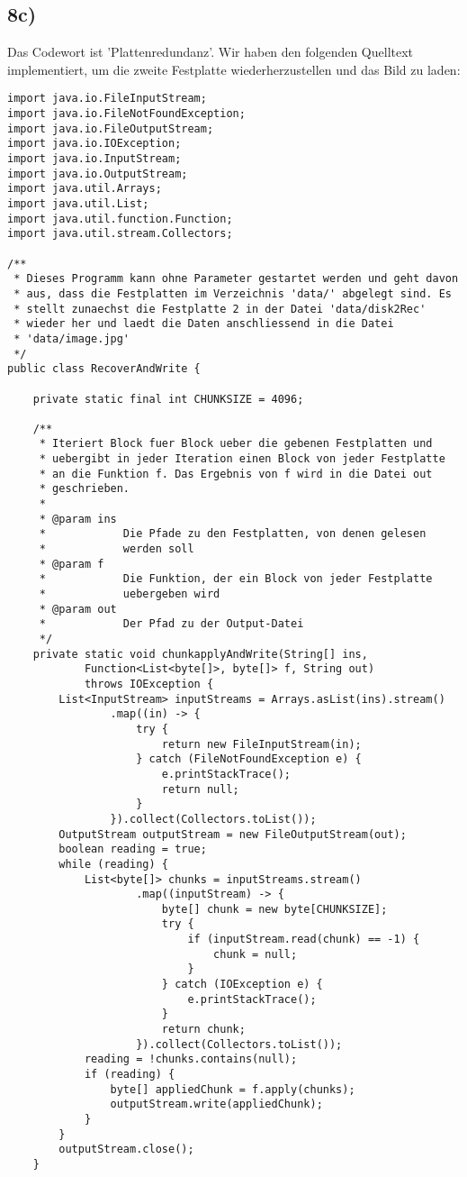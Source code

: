 \documentclass[ngerman]{fbi-aufgabenblatt}
\begin{document}
\subsection*{8c)}
Das Codewort ist 'Plattenredundanz'. Wir haben den folgenden Quelltext implementiert, um die zweite Festplatte wiederherzustellen und das Bild zu laden:
\lstset{tabsize=2}
\begin{lstlisting}
import java.io.FileInputStream;
import java.io.FileNotFoundException;
import java.io.FileOutputStream;
import java.io.IOException;
import java.io.InputStream;
import java.io.OutputStream;
import java.util.Arrays;
import java.util.List;
import java.util.function.Function;
import java.util.stream.Collectors;

/**
 * Dieses Programm kann ohne Parameter gestartet werden und geht davon
 * aus, dass die Festplatten im Verzeichnis 'data/' abgelegt sind. Es
 * stellt zunaechst die Festplatte 2 in der Datei 'data/disk2Rec'
 * wieder her und laedt die Daten anschliessend in die Datei
 * 'data/image.jpg'
 */
public class RecoverAndWrite {

	private static final int CHUNKSIZE = 4096;

	/**
	 * Iteriert Block fuer Block ueber die gebenen Festplatten und
	 * uebergibt in jeder Iteration einen Block von jeder Festplatte
	 * an die Funktion f. Das Ergebnis von f wird in die Datei out
	 * geschrieben.
	 * 
	 * @param ins
	 *            Die Pfade zu den Festplatten, von denen gelesen
	 *            werden soll
	 * @param f
	 *            Die Funktion, der ein Block von jeder Festplatte
	 *            uebergeben wird
	 * @param out
	 *            Der Pfad zu der Output-Datei
	 */
	private static void chunkapplyAndWrite(String[] ins,
			Function<List<byte[]>, byte[]> f, String out)
			throws IOException {
		List<InputStream> inputStreams = Arrays.asList(ins).stream()
				.map((in) -> {
					try {
						return new FileInputStream(in);
					} catch (FileNotFoundException e) {
						e.printStackTrace();
						return null;
					}
				}).collect(Collectors.toList());
		OutputStream outputStream = new FileOutputStream(out);
		boolean reading = true;
		while (reading) {
			List<byte[]> chunks = inputStreams.stream()
					.map((inputStream) -> {
						byte[] chunk = new byte[CHUNKSIZE];
						try {
							if (inputStream.read(chunk) == -1) {
								chunk = null;
							}
						} catch (IOException e) {
							e.printStackTrace();
						}
						return chunk;
					}).collect(Collectors.toList());
			reading = !chunks.contains(null);
			if (reading) {
				byte[] appliedChunk = f.apply(chunks);
				outputStream.write(appliedChunk);
			}
		}
		outputStream.close();
	}


\end{lstlisting}
\end{document}
